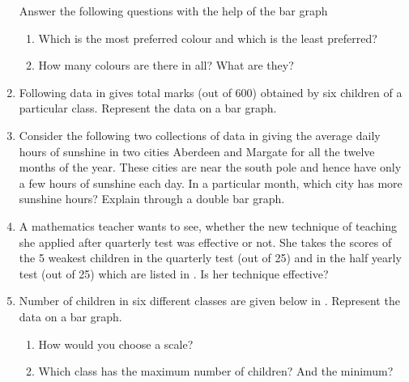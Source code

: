 \begin{enumerate}[label=\thesubsection.\arabic*, ref=\thesubsection.\theenumi,resume*]
\begin{table}[H]
  
  \caption{}
  \label{tab:colour}
\end{table}
Answer the following questions with the help of the bar graph
	\begin{enumerate}
	\item Which is the most preferred colour and which is the least preferred? 
	\item How many colours are there in all? What are they?
	\end{enumerate}
\item Following data 
  in 
	gives total marks (out of 600) obtained by six children of a particular class. Represent the data on a bar graph.
	\begin{table}[H]
  \centering
  
  \caption{}
  \label{tab:marks}
\end{table}
\item Consider the following two collections of data 
in
	giving the average daily hours of sunshine in two cities Aberdeen and Margate for all the twelve months of the year. These cities are near the south pole and hence have only a few hours of sunshine each day.
	In a particular month, which city has more sunshine hours?  Explain through a double bar graph.
	\begin{table}[H]
  \centering
  
  \caption{}
  \label{tab:hours}
\end{table}
\item A mathematics teacher wants to see, whether the new technique of teaching she applied after quarterly test was effective or not. She takes the scores of the 5 weakest children in the quarterly test (out of 25) and in the half yearly test (out of 25) which are listed in 
  .  Is her technique effective?
	\begin{table}[H]
  \centering
  
  \caption{}
  \label{tab:students}
\end{table}
\item 
	Number of children in six different classes are given below
  in .  
 Represent the data on a bar graph.
	\begin{table}[H]
  \centering
  
  \caption{}
  \label{tab:children}
\end{table}
\begin{enumerate}
	\item How would you choose a scale? 
	\item  Which class has the maximum number of children? And the minimum? 

\end{enumerate}
\end{enumerate}
